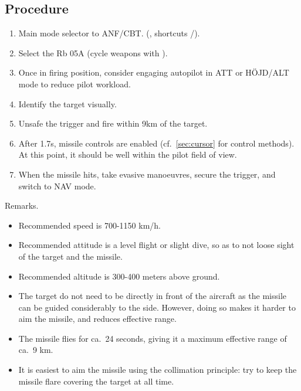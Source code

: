 \documentclass[a4paper]{report}
\begin{document}
{\subsection{Procedure}
\begin{enumerate}
  \item Main mode selector to ANF/CBT.
    (, shortcuts /).
  \item Select the Rb 05A (cycle weapons with ).
  \item Once in firing position, consider engaging autopilot in ATT or HÖJD/ALT mode to reduce pilot workload.
  \item Identify the target visually.
  \item Unsafe the trigger and fire within 9km of the target.
  \item After 1.7s, missile controls are enabled
    (cf.\ \cref{sec:cursor} for control methods).
    At this point, it should be well within the pilot field of view.
  \item When the missile hits, take evasive manoeuvres, secure the trigger, and switch to NAV mode.
\end{enumerate}

Remarks.
\begin{itemize}
  \item Recommended speed is 700-1150 km/h.
  \item Recommended attitude is a level flight or slight dive,
    so as to not loose sight of the target and the missile.
  \item Recommended altitude is 300-400 meters above ground.
  \item The target do not need to be directly in front of the aircraft
    as the missile can be guided considerably to the side.
    However, doing so makes it harder to aim the missile, and reduces effective range.
  \item The missile flies for ca.\ 24 seconds, giving it a maximum effective range of ca.\ 9 km.
  \item It is easiest to aim the missile using the collimation principle:
    try to keep the missile flare covering the target at all time.
\end{itemize}
}
\end{document}

